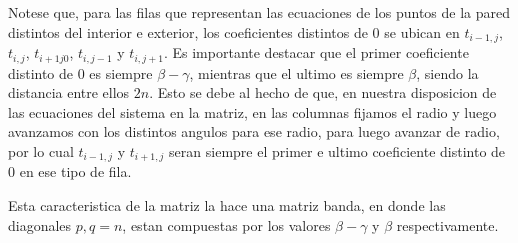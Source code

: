 \medskip
Notese que, para las filas que representan las ecuaciones de los puntos de la pared distintos del interior e exterior, los coeficientes distintos de 0 se ubican en $t_{i-1,j}$, $t_{i,j}$, $t_{i+1j0}$, $t_{i,j-1}$ y $t_{i,j+1}$.
Es importante destacar que el primer coeficiente distinto de 0 es siempre $\beta - \gamma$, mientras que el ultimo es siempre $\beta$, siendo la distancia entre ellos $2n$. Esto se debe al hecho de que, en nuestra disposicion de las ecuaciones del sistema en la matriz,
en las columnas fijamos el radio y luego avanzamos con los distintos angulos para ese radio, para luego avanzar de radio, por lo cual $t_{i-1,j}$ y $t_{i+1,j}$ seran siempre el primer e ultimo coeficiente distinto de 0 en ese tipo de fila.

Esta caracteristica de la matriz la hace una matriz banda, en donde las diagonales $p, q = n$, estan compuestas por los valores $\beta - \gamma$ y $\beta$ respectivamente.
